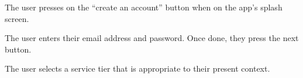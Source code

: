 \begin{minipage}{\textwidth}
  \centering
  \begin{minipage}[t]{4.6cm}
    \vspace{0pt}
    \centering
    \begin{minipage}{4.4cm}
      The user presses on the ``create an account'' button when on the app's splash screen.
    \end{minipage}
  \end{minipage}
  \begin{minipage}[t]{4.6cm}
    \vspace{0pt}
    \centering
    \begin{minipage}{4.4cm}
      The user enters their email address and password. Once done, they press the next button.
    \end{minipage}
  \end{minipage}
  \begin{minipage}[t]{4.6cm}
    \vspace{0pt}
    \centering
    \begin{minipage}{4.4cm}
      The user selects a service tier that is appropriate to their present context.
    \end{minipage}
  \end{minipage}
\end{minipage}

